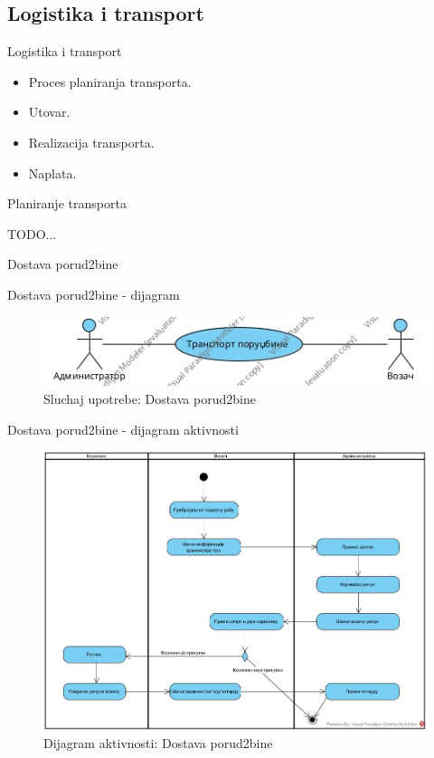 \documentclass[11pt]{beamer}
\begin{document}
\subsection{Logistika i transport}
\begin{frame}{Logistika i transport}
   \begin{itemize}
       \item Proces planiranja transporta.
       \item Utovar.
       \item Realizacija transporta.
       \item Naplata.
   \end{itemize}

\end{frame}
\begin{frame}{Planiranje transporta}
   
TODO...
\end{frame}
\begin{frame}{Dostava porud2bine}
   

\end{frame}
\begin{frame}{Dostava porud2bine - dijagram}
\begin{figure}
    \centering
    \includegraphics[scale=0.6]{Slike/UML/SUdostavljanjePorudzbineUseCase.jpg}
    \caption{Sluchaj upotrebe: Dostava porud2bine}
    \label{fig:dp}
\end{figure}
\end{frame}
\begin{frame}{Dostava porud2bine - dijagram aktivnosti}
\begin{figure}
    \centering
    \includegraphics[scale=0.23]{Slike/DFD/AD_transport.jpg}
    \caption{Dijagram aktivnosti: Dostava porud2bine}
    \label{fig:dadp}
\end{figure}
\end{frame}
\end{document}
